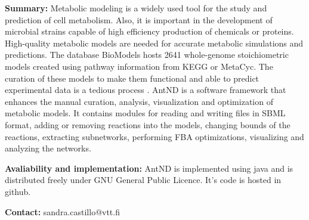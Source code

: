 
\textbf{Summary:} Metabolic modeling is a widely used tool for the study and prediction of cell metabolism. Also, it is important in the development of microbial strains capable of high efficiency production of chemicals or proteins. High-quality metabolic models are needed for accurate metabolic simulations and predictions. The database BioModels \cite{juty_biomodels:_2015} hosts 2641 whole-genome stoichiometric models created using pathway information from KEGG or MetaCyc. The curation of these models to make them functional and able to predict experimental data is a tedious process \cite{thiele_protocol_2010}.  AntND is a software framework that enhances the manual curation, analysis, visualization and optimization of metabolic models. It contains modules for reading and writing files in SBML format, adding or removing reactions into the models, changing bounds of the reactions, extracting subnetworks, performing FBA optimizations, visualizing and analyzing the networks. 

\textbf{Avaliability and implementation:} AntND is implemented using java and is distributed freely under GNU General Public Licence. It's code is hosted in github. 

\textbf{Contact:} sandra.castillo@vtt.fi
